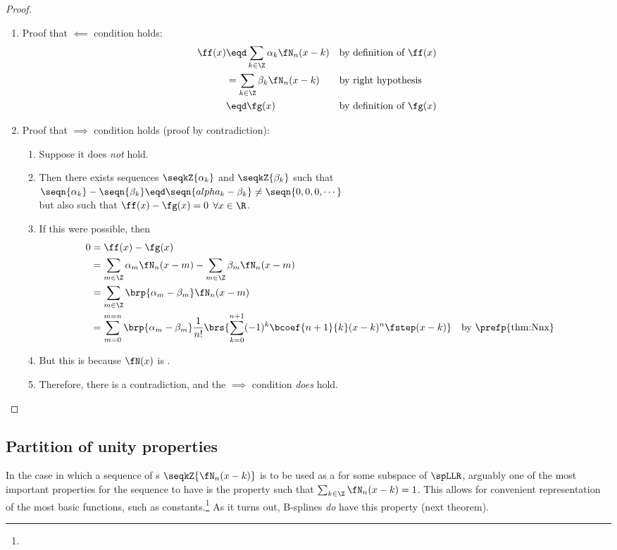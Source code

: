 \begin{proof}
\begin{enumerate}
  \item Proof that $\impliedby$ condition holds:
    \begin{align*}
      \ff(x) 
        &\eqd \sum_{k\in\Z} \alpha_k \fN_n(x-k)
        &&    \text{by definition of $\ff(x)$}
      \\&=    \sum_{k\in\Z} \beta_k \fN_n(x-k)
        &&    \text{by right hypothesis}
      \\&\eqd \fg(x)
        &&    \text{by definition of $\fg(x)$}
    \end{align*}

  \item Proof that $\implies$ condition holds (proof by contradiction):
    \begin{enumerate}
      \item Suppose it does \emph{not} hold. 
      \item Then there exists sequences $\seqkZ{\alpha_k}$ and $\seqkZ{\beta_k}$ such that 
        \\\indentx$\seqn{\alpha_k}-\seqn{\beta_k}\eqd\seqn{alpha_k-\beta_k}\neq\seqn{0,0,0,\cdots}$\\
        but also such that $\ff(x)-\fg(x)=0$ $\forall x\in\R$.
      \item If this were possible, then 
        \begin{align*}
          0
            &= \ff(x)-\fg(x)
          \\&= \sum_{m\in\Z}\alpha_m \fN_n(x-m) - \sum_{m\in\Z}\beta_m \fN_n(x-m)
          \\&= \sum_{m\in\Z}\brp{\alpha_m-\beta_m} \fN_n(x-m) 
          \\&= \sum_{m=0}^{m=n} \brp{\alpha_m-\beta_m} \frac{1}{n!} \brs{\sum_{k=0}^{n+1} (-1)^k \bcoef{n+1}{k} (x-k)^{n} \fstep(x-k)} 
            && \text{by \prefp{thm:Nnx}}
        \end{align*}
      \item But this is  because $\fN(x)$ is  .
      \item Therefore, there is a contradiction, and the $\implies$ condition \emph{does} hold.
    \end{enumerate}
\end{enumerate}
\end{proof}

\subsection{Partition of unity properties}
In the case in which a sequence of s $\seqkZ{\fN_n(x-k)}$
is to be used as a  for some subspace of $\spLLR$,
arguably one of the most important properties for the sequence to have is the  property
such that $\sum_{k\in\Z}\fN_n(x-k)=1$.
This allows for convenient representation of the most basic functions, such as constants.\footnote{}
As it turns out, B-splines \emph{do} have this property (next theorem).

